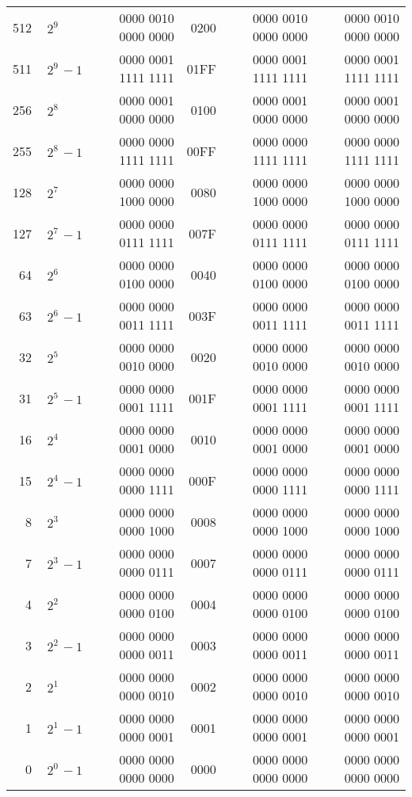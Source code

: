 \documentclass[a4paper,10pt]{article}
\begin{document}
\begin{center}
\begin{tabular}{rlrrrr}
      512 &$ ~2^{9~}     $& 0000 0010 0000 0000 & 0200 & 0000 0010 0000 0000 & 0000 0010 0000 0000 \\
      511 &$ ~2^{9~} - 1 $& 0000 0001 1111 1111 & 01FF & 0000 0001 1111 1111 & 0000 0001 1111 1111 \\
      256 &$ ~2^{8~}     $& 0000 0001 0000 0000 & 0100 & 0000 0001 0000 0000 & 0000 0001 0000 0000 \\
      255 &$ ~2^{8~} - 1 $& 0000 0000 1111 1111 & 00FF & 0000 0000 1111 1111 & 0000 0000 1111 1111 \\
      128 &$ ~2^{7~}     $& 0000 0000 1000 0000 & 0080 & 0000 0000 1000 0000 & 0000 0000 1000 0000 \\
      127 &$ ~2^{7~} - 1 $& 0000 0000 0111 1111 & 007F & 0000 0000 0111 1111 & 0000 0000 0111 1111 \\
       64 &$ ~2^{6~}     $& 0000 0000 0100 0000 & 0040 & 0000 0000 0100 0000 & 0000 0000 0100 0000 \\
       63 &$ ~2^{6~} - 1 $& 0000 0000 0011 1111 & 003F & 0000 0000 0011 1111 & 0000 0000 0011 1111 \\
       32 &$ ~2^{5~}     $& 0000 0000 0010 0000 & 0020 & 0000 0000 0010 0000 & 0000 0000 0010 0000 \\
       31 &$ ~2^{5~} - 1 $& 0000 0000 0001 1111 & 001F & 0000 0000 0001 1111 & 0000 0000 0001 1111 \\
       16 &$ ~2^{4~}     $& 0000 0000 0001 0000 & 0010 & 0000 0000 0001 0000 & 0000 0000 0001 0000 \\
       15 &$ ~2^{4~} - 1 $& 0000 0000 0000 1111 & 000F & 0000 0000 0000 1111 & 0000 0000 0000 1111 \\
        8 &$ ~2^{3~}     $& 0000 0000 0000 1000 & 0008 & 0000 0000 0000 1000 & 0000 0000 0000 1000 \\
        7 &$ ~2^{3~} - 1 $& 0000 0000 0000 0111 & 0007 & 0000 0000 0000 0111 & 0000 0000 0000 0111 \\
        4 &$ ~2^{2~}     $& 0000 0000 0000 0100 & 0004 & 0000 0000 0000 0100 & 0000 0000 0000 0100 \\
        3 &$ ~2^{2~} - 1 $& 0000 0000 0000 0011 & 0003 & 0000 0000 0000 0011 & 0000 0000 0000 0011 \\
        2 &$ ~2^{1~}     $& 0000 0000 0000 0010 & 0002 & 0000 0000 0000 0010 & 0000 0000 0000 0010 \\
        1 &$ ~2^{1~} - 1 $& 0000 0000 0000 0001 & 0001 & 0000 0000 0000 0001 & 0000 0000 0000 0001 \\
        0 &$ ~2^{0~} - 1 $& 0000 0000 0000 0000 & 0000 & 0000 0000 0000 0000 & 0000 0000 0000 0000 \\

\end{tabular}
\end{center}
\end{document}
